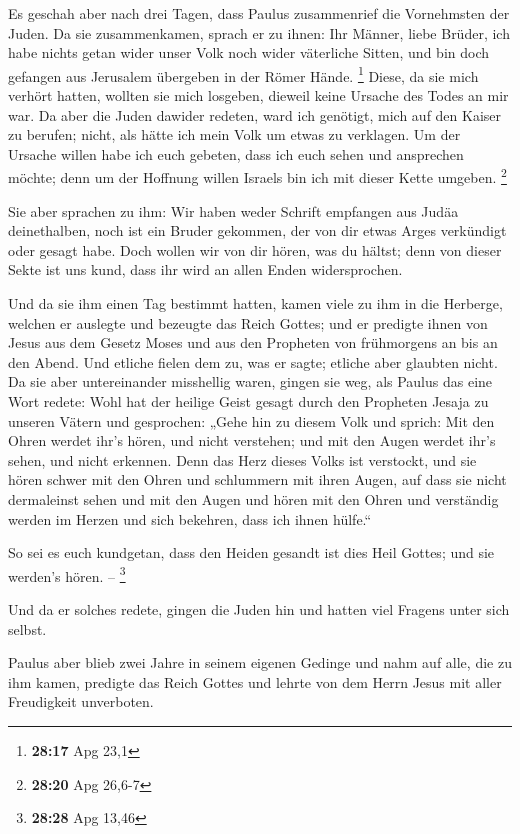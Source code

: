  Es geschah aber nach drei Tagen, dass Paulus
zusammenrief die Vornehmsten der Juden. Da sie zusammenkamen, sprach er
zu ihnen: Ihr Männer, liebe Brüder, ich habe nichts getan wider unser
Volk noch wider väterliche Sitten, und bin doch gefangen aus Jerusalem
übergeben in der Römer Hände. \footnote{\textbf{28:17} Apg 23,1}
 Diese, da sie mich verhört hatten, wollten sie mich
losgeben, dieweil keine Ursache des Todes an mir war.  Da
aber die Juden dawider redeten, ward ich genötigt, mich auf den Kaiser
zu berufen; nicht, als hätte ich mein Volk um etwas zu verklagen.
 Um der Ursache willen habe ich euch gebeten, dass ich
euch sehen und ansprechen möchte; denn um der Hoffnung willen Israels
bin ich mit dieser Kette umgeben. \footnote{\textbf{28:20} Apg 26,6-7}

 Sie aber sprachen zu ihm: Wir haben weder Schrift
empfangen aus Judäa deinethalben, noch ist ein Bruder gekommen, der von
dir etwas Arges verkündigt oder gesagt habe.  Doch wollen
wir von dir hören, was du hältst; denn von dieser Sekte ist uns kund,
dass ihr wird an allen Enden widersprochen.

 Und da sie ihm einen Tag bestimmt hatten, kamen viele zu
ihm in die Herberge, welchen er auslegte und bezeugte das Reich Gottes;
und er predigte ihnen von Jesus aus dem Gesetz Moses und aus den
Propheten von frühmorgens an bis an den Abend.  Und
etliche fielen dem zu, was er sagte; etliche aber glaubten nicht.
 Da sie aber untereinander misshellig waren, gingen sie
weg, als Paulus das eine Wort redete: Wohl hat der heilige Geist gesagt
durch den Propheten Jesaja zu unseren Vätern  und
gesprochen: „Gehe hin zu diesem Volk und sprich: Mit den Ohren werdet
ihr's hören, und nicht verstehen; und mit den Augen werdet ihr's sehen,
und nicht erkennen.  Denn das Herz dieses Volks ist
verstockt, und sie hören schwer mit den Ohren und schlummern mit ihren
Augen, auf dass sie nicht dermaleinst sehen und mit den Augen und hören
mit den Ohren und verständig werden im Herzen und sich bekehren, dass
ich ihnen hülfe.``

 So sei es euch kundgetan, dass den Heiden gesandt ist
dies Heil Gottes; und sie werden's hören. -- \footnote{\textbf{28:28}
  Apg 13,46}

 Und da er solches redete, gingen die Juden hin und
hatten viel Fragens unter sich selbst.

 Paulus aber blieb zwei Jahre in seinem eigenen Gedinge
und nahm auf alle, die zu ihm kamen,  predigte das Reich
Gottes und lehrte von dem Herrn Jesus mit aller Freudigkeit unverboten.
